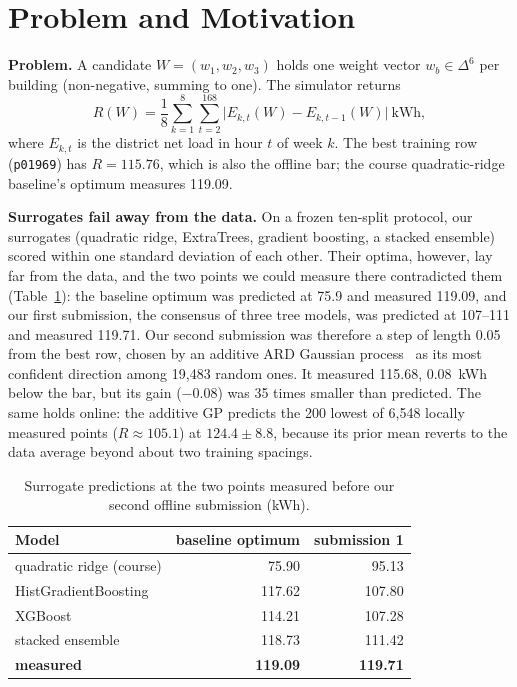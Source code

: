 \section{Problem and Motivation}
\label{sec:problem}
\textbf{Problem.} A candidate $W=(w_1,w_2,w_3)$ holds one weight vector $w_b\in\Delta^6$ per building (non-negative,
summing to one). The simulator returns
\begin{equation}
R(W)=\frac{1}{8}\sum_{k=1}^{8}\sum_{t=2}^{168}\bigl|E_{k,t}(W)-E_{k,t-1}(W)\bigr|\ \text{kWh},
\label{eq:R}
\end{equation}
where $E_{k,t}$ is the district net load in hour $t$ of week $k$. The best training row (\texttt{p01969}) has
$R=115.76$, which is also the offline bar; the course quadratic-ridge baseline's optimum measures 119.09.

\textbf{Surrogates fail away from the data.} On a frozen ten-split protocol, our surrogates (quadratic ridge,
ExtraTrees, gradient boosting, a stacked ensemble) scored within one standard deviation of each other. Their optima,
however, lay far from the data, and the two points we could measure there contradicted them (Table~\ref{tab:offline}):
the baseline optimum was predicted at 75.9 and measured 119.09, and our first submission, the consensus of three tree
models, was predicted at 107--111 and measured 119.71. Our second submission was therefore a step of length 0.05 from
the best row, chosen by an additive ARD Gaussian process~\cite{rasmussen} as its most confident direction among
19,483 random ones. It measured 115.68, 0.08~kWh below the bar, but its gain ($-0.08$) was 35 times smaller than predicted.
The same holds online: the additive GP predicts the 200 lowest of 6,548 locally measured points ($R\approx105.1$) at
$124.4\pm8.8$, because its prior mean reverts to the data average beyond about two training spacings.

\begin{table}[t]
\centering
\caption{Surrogate predictions at the two points measured before our second offline submission (kWh).}
\label{tab:offline}
\begin{tabular}{lrr}
\toprule
Model & baseline optimum & submission 1\\
\midrule
quadratic ridge (course) & 75.90 & 95.13\\
HistGradientBoosting & 117.62 & 107.80\\
XGBoost & 114.21 & 107.28\\
stacked ensemble & 118.73 & 111.42\\
\midrule
\textbf{measured} & \textbf{119.09} & \textbf{119.71}\\
\bottomrule
\end{tabular}
\end{table}

